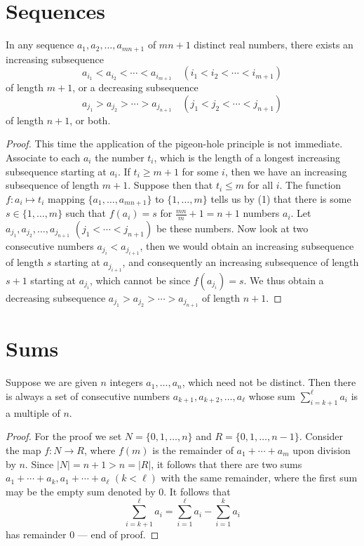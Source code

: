 \section{Sequences}

\begin{theorem}[Claim]
  \label{ch28claim3}
  In any sequence $a_1, a_2, \ldots, a_{mn+1}$ of $mn+1$ distinct real numbers, there exists an increasing subsequence
\[
a_{i_1} < a_{i_2} < \cdots < a_{i_{m+1}} \quad (i_1 < i_2 < \cdots < i_{m+1})
\]
of length $m+1$, or a decreasing subsequence
\[
a_{j_1} > a_{j_2} > \cdots > a_{j_{n+1}} \quad (j_1 < j_2 < \cdots < j_{n+1})
\]
of length $n+1$, or both.
\end{theorem}
\begin{proof}
This time the application of the pigeon-hole principle is not immediate.
Associate to each $a_i$ the number $t_i$, which is the length of a longest
increasing subsequence starting at $a_i$. If $t_i \geq m+1$ for some $i$,
then we have an increasing subsequence of length $m+1$. Suppose then
that $t_i \leq m$ for all $i$. The function $f : a_i \mapsto t_i$ mapping
$\{a_1, \dots, a_{mn+1}\}$ to $\{1, \dots, m\}$ tells us by (1) that there
is some $s \in \{1, \dots, m\}$ such that $f(a_i) = s$ for $\frac{mn}{m} + 1 = n + 1$
numbers $a_i$. Let $a_{j_1}, a_{j_2}, \dots, a_{j_{n+1}}$ $(j_1 < \cdots < j_{n+1})$
be these numbers. Now look at two consecutive numbers $a_{j_i} < a_{j_{i+1}}$,
then we would obtain an increasing subsequence of length $s$ starting
at $a_{j_{i+1}}$, and consequently an increasing subsequence of length $s+1$
starting at $a_{j_i}$, which cannot be since $f(a_{j_i}) = s$.
We thus obtain a decreasing subsequence $a_{j_1} > a_{j_2} > \cdots > a_{j_{n+1}}$
of length $n+1$.
\end{proof}

\section{Sums}

\begin{theorem}[Claim]
  \label{ch28claim4}
  Suppose we are given $n$ integers $a_1, \dots, a_n$, which need not be distinct.
  Then there is always a set of consecutive numbers $a_{k+1}, a_{k+2}, \dots, a_{\ell}$
  whose sum $\sum_{i=k+1}^{\ell} a_i$ is a multiple of $n$.
\end{theorem}
\begin{proof}
  For the proof we set $N = \{0, 1, \dots, n\}$ and $R = \{0, 1, \dots, n-1\}$.
  Consider the map $f : N \to R$, where $f(m)$ is the remainder of $a_1 + \cdots + a_m$
  upon division by $n$. Since $|N| = n+1 > n = |R|$,
  it follows that there are two sums $a_1 + \cdots + a_k, a_1 + \cdots + a_{\ell}$ $(k < \ell)$
  with the same remainder, where the first sum may be the empty sum denoted by $0$. It follows that
  \[
  \sum_{i=k+1}^{\ell} a_i = \sum_{i=1}^{\ell} a_i - \sum_{i=1}^{k} a_i
  \]
  has remainder 0 — end of proof.
\end{proof}

